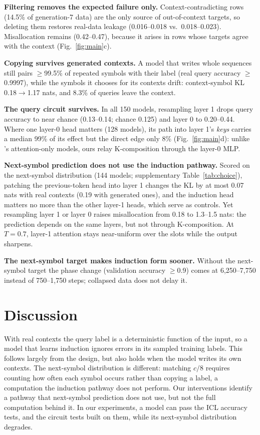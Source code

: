 \documentclass[10pt,letterpaper]{article}
\begin{document}
\textbf{Filtering removes the expected failure only.} Context-contradicting rows (14.5\% of generation-7 data) are the only source of out-of-context targets, so deleting them restores real-data leakage (0.016--0.018 vs.\ 0.018--0.023). Misallocation remains (0.42--0.47), because it arises in rows whose targets agree with the context (Fig.~\ref{fig:main}c).

\textbf{Copying survives generated contexts.} A model that writes whole sequences still pairs $\geq$99.5\% of repeated symbols with their label (real query accuracy $\geq$0.9997), while the symbols it chooses for its contexts drift: context-symbol KL 0.18$\to$1.17 nats, and 8.3\% of queries leave the context.

\textbf{The query circuit survives.} In all 150 models, resampling layer 1 drops query accuracy to near chance (0.13--0.14; chance 0.125) and layer 0 to 0.20--0.44. Where one layer-0 head matters (128 models), its path into layer 1's \emph{keys} carries a median 99\% of its effect but the direct edge only 8\% (Fig.~\ref{fig:main}d): unlike \citet{singh2024needs}'s attention-only models, ours relay K-composition through the layer-0 MLP.

\textbf{Next-symbol prediction does not use the induction pathway.} Scored on the next-symbol distribution (144 models; supplementary Table~\ref{tab:choice}), patching the previous-token head into layer 1 changes the KL by at most 0.07 nats with real contexts (0.19 with generated ones), and the induction head matters no more than the other layer-1 heads, which serve as controls. Yet resampling layer 1 or layer 0 raises misallocation from 0.18 to 1.3--1.5 nats: the prediction depends on the same layers, but not through K-composition. At $T{=}0.7$, layer-1 attention stays near-uniform over the slots while the output sharpens.

\textbf{The next-symbol target makes induction form sooner.} Without the next-symbol target the phase change (validation accuracy $\geq$0.9) comes at 6{,}250--7{,}750 instead of 750--1{,}750 steps; collapsed data does not delay it.

\section{Discussion}
With real contexts the query label is a deterministic function of the input, so a model that learns induction ignores errors in its sampled training labels. This follows largely from the design, but also holds when the model writes its own contexts. The next-symbol distribution is different: matching $c/8$ requires counting how often each symbol occurs rather than copying a label, a computation the induction pathway does not perform. Our interventions identify a pathway that next-symbol prediction does not use, but not the full computation behind it. In our experiments, a model can pass the ICL accuracy tests, and the circuit tests built on them, while its next-symbol distribution degrades.
\end{document}

